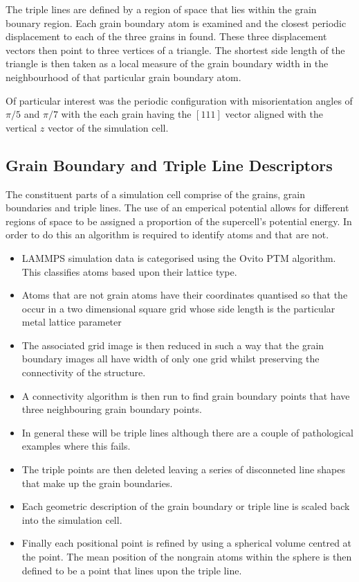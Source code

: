 \documentclass[12pt,a4paper]{book}
\begin{document}
The triple lines are defined by a region of space that lies within the grain bounary region. Each grain boundary atom is examined and the closest periodic displacement to each of the three grains in found. These three displacement vectors then point to three vertices of a triangle. The shortest side length of the triangle is then taken as a local measure of the grain boundary width in the neighbourhood of that particular grain boundary atom.  

Of particular interest was the periodic configuration with misorientation angles of $\pi/5$ and $\pi/7$ with the each grain having the $[1 1 1]$ vector aligned with the vertical $z$ vector of the simulation cell.

\subsection{Grain Boundary and Triple Line Descriptors}

The constituent parts of a simulation cell comprise of the grains, grain boundaries and triple lines. The use of an emperical potential allows for different regions of space to be assigned a proportion of the supercell's potential energy. In order to do this an algorithm is required to identify atoms and that are not.

\begin{itemize}

	\item LAMMPS simulation data is categorised using the Ovito PTM algorithm. This classifies atoms based upon their lattice type.
	\item Atoms that are not grain  atoms have their coordinates quantised so that the occur in a two dimensional square grid whose side length is the particular metal lattice parameter
	\item The associated grid image is then reduced in such a way that the grain boundary images all have width of only one grid whilst preserving the connectivity of the structure.
	\item A connectivity algorithm is then run to find grain boundary points that have three neighbouring grain boundary points.
	\item In general these will be triple lines although there are a couple of pathological examples where this fails.
	\item The triple points are then deleted leaving a series of disconneted line shapes that make up the grain boundaries.
	\item Each geometric description of the grain boundary or triple line is scaled back into the simulation cell. 
	\item Finally each positional point is refined by using a spherical volume centred at the point. The mean position of the nongrain atoms within the sphere is then defined to be a point that lines upon the triple line. 

\end{itemize} 
\end{document}
